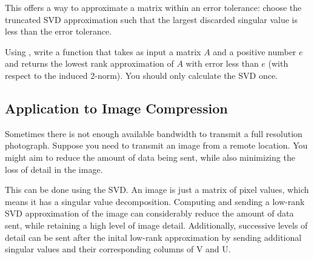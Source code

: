 This offers a way to approximate a matrix within an error tolerance: 
choose the truncated SVD approximation such that the largest discarded singular value is less than the error tolerance.

\begin{problem}
Using , write a function  that takes as input a matrix $A$ and a positive number $e$ and returns
the lowest rank approximation of $A$ with error less than $e$ (with respect to the induced 2-norm).
You should only calculate the SVD once.
\end{problem}

\subsection*{Application to Image Compression}

Sometimes there is not enough available bandwidth to transmit a full resolution photograph.
Suppose you need to transmit an image from a remote location.
You might aim to reduce the amount of data being sent, while also minimizing the loss of detail in the image.

This can be done using the SVD.
An image is just a matrix of pixel values, which means it has a singular value decomposition.
Computing and sending a low-rank SVD approximation of the image can considerably reduce the amount of data sent, while retaining a high level of image detail.
Additionally, successive levels of detail can be sent after the inital low-rank approximation by sending additional singular values and their corresponding columns of V and U.

